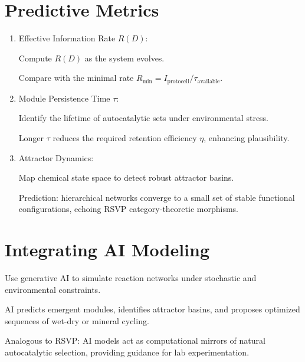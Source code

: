 \documentclass{book}
\begin{document}
\section{Predictive Metrics}
\begin{enumerate}
\item Effective Information Rate $R(D)$:

Compute $R(D)$ as the system evolves.

Compare with the minimal rate $R_{\min} = I_{\text{protocell}} / \tau_{\text{available}}$.

\item Module Persistence Time $\tau$:

Identify the lifetime of autocatalytic sets under environmental stress.

Longer $\tau$ reduces the required retention efficiency $\eta$, enhancing plausibility.

\item Attractor Dynamics:

Map chemical state space to detect robust attractor basins.

Prediction: hierarchical networks converge to a small set of stable functional configurations, echoing RSVP category-theoretic morphisms.
\end{enumerate}

\section{Integrating AI Modeling}
Use generative AI to simulate reaction networks under stochastic and environmental constraints.

AI predicts emergent modules, identifies attractor basins, and proposes optimized sequences of wet-dry or mineral cycling.

Analogous to RSVP: AI models act as computational mirrors of natural autocatalytic selection, providing guidance for lab experimentation.
\end{document}
